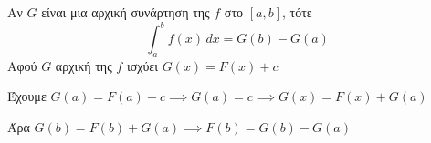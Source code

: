 \documentclass{presentation}
\begin{document}
\begin{apodiksi}
  Αν $G$ είναι μια αρχική συνάρτηση της $f$ στο $[a,b]$, τότε
  $$\int_a^b f(x)\,dx = G(b)-G(a)$$
  Αφού $G$ αρχική της $f$ ισχύει $G(x) =F(x)+c$

  Έχουμε $G(a)=F(a)+c\implies G(a)=c \implies G(x)=F(x)+G(a)$

  Άρα    $G(b) =F(b)+G(a) \implies F(b)=G(b)-G(a)$

\end{apodiksi}

\moodle
\end{document}
